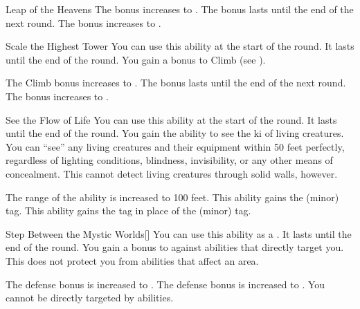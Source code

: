 {\begin{apability}{Leap of the Heavens}
                \rankline
                 The bonus increases to .
                 The bonus lasts until the end of the next round.
                 The bonus increases to .
            \end{apability}

            \begin{apability}{Scale the Highest Tower}
                You can use this ability at the start of the round.
                It lasts until the end of the round.
                You gain a  bonus to Climb (see ).

                \rankline
                 The Climb bonus increases to .
                 The bonus lasts until the end of the next round.
                 The bonus increases to .
            \end{apability}

            \begin{apability}{See the Flow of Life}
                You can use this ability at the start of the round.
                It lasts until the end of the round.
                You gain the ability to see the ki of living creatures.
                You can ``see'' any living creatures and their equipment within 50 feet perfectly, regardless of lighting conditions, blindness, invisibility, or any other means of concealment.
                This cannot detect living creatures through solid walls, however.

                \rankline
                 The range of the ability is increased to 100 feet.
                 This ability gains the  (minor) tag.
                 This ability gains the  tag in place of the  (minor) tag.
            \end{apability}

            \begin{apability}{Step Between the Mystic Worlds}[]
                You can use this ability as a .
                It lasts until the end of the round.
                You gain a  bonus to  against  abilities that directly target you.
                This does not protect you from abilities that affect an area.

                \rankline
                 The defense bonus is increased to .
                 The defense bonus is increased to .
                 You cannot be directly targeted by  abilities.
            \end{apability}

}
